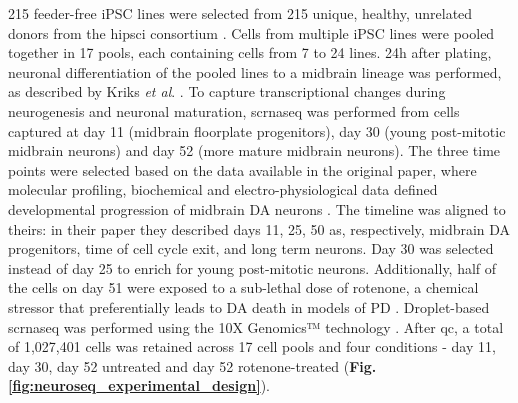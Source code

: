 215 feeder-free iPSC lines 
were selected
from 215 unique, healthy, unrelated donors from the \gls{hipsci} consortium \cite{kilpinen2017common}.
Cells from multiple iPSC lines were pooled together in 17 pools, each containing cells from 7 to 24 lines.
24h after plating, neuronal differentiation of the pooled lines to a midbrain lineage was performed, as described by Kriks \textit{et al}. \cite{kriks2011dopamine}. 
To capture transcriptional changes during neurogenesis and neuronal maturation, 
\gls{scrnaseq} 
was performed
from cells captured at day 11 (midbrain floorplate progenitors), day 30 (young post-mitotic midbrain neurons) and day 52 (more mature midbrain neurons). 
The
three time points 
were selected based on the data available in the original paper, where molecular profiling, biochemical and electro-physiological data defined developmental progression of midbrain DA neurons \cite{kriks2011dopamine}. 
The timeline was aligned to theirs:
in their paper they described days 11, 25, 50
as, respectively, midbrain DA progenitors, time of cell cycle exit, 
and
long term neurons.
Day 30 was selected instead of day 25 to enrich for young post-mitotic neurons. 
Additionally, 
half of the cells on day 51 
were exposed
to a sub-lethal dose of rotenone, a chemical stressor that preferentially leads to DA death in models of PD \cite{xiong2012mitochondrial}.
Droplet-based \gls{scrnaseq} was performed using the 10X Genomics™ technology \cite{zheng2017massively}.
After \gls{qc}, 
a total of 1,027,401 cells
was retained
across 17 cell pools and four conditions - day 11, day 30, day 52 untreated and day 52 rotenone-treated (\textbf{Fig. \ref{fig:neuroseq_experimental_design}}).


